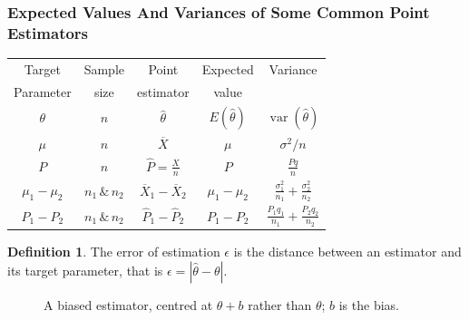 \documentclass[11pt,a4paper]{article}
\theoremstyle{definition}
\newtheorem{definition}[thm]{Definition}
\begin{document}
\subsubsection{Expected Values And Variances of Some Common Point Estimators}


\begin{table}[H]
\centering
\begin{tabular}{|c|c|c|c|c|}
\hline Target & Sample & Point & Expected & Variance\\
Parameter & size & estimator & value &\\
$\theta$ & $n$ & $\hat{\theta}$ & $E(\hat{\theta})$ & $\operatorname{var}(\hat{\theta})$\\
\hline $\mu$ & $n$ & $\overline{X}$ & $\mu$ & $\sigma^2/n$\\
$P$ & $n$ & $\hat{P}=\frac{X}{n}$ & $P$ & $\frac{Pq}{n}$\\
$\mu_1-\mu_2$ & $n_1\, \&\, n_2$ & $\overline{X}_1-\overline{X}_2$ & $\mu_1-\mu_2$& $\frac{\sigma^2_1}{n_1}+\frac{\sigma^2_2}{n_2}$\\
$P_1-P_2$ & $n_1\,\&\, n_2$ & $\hat{P}_1-\hat{P}_2$ & $P_1-P_2$ & $\frac{P_1q_1}{n_1}+\frac{P_2q_2}{n_2}$\\
\hline
\end{tabular}
\end{table}



\vspace{0.3cm}

\begin{definition}
The error of estimation $\epsilon$ is the distance between an estimator and its target parameter, that is $\epsilon =|\hat{\theta}-\theta|$.
\end{definition}





\begin{figure}[H]
\centering
{}
\caption{A biased estimator, centred at $\theta+b$ rather than $\theta$; $b$ is the bias.}
\end{figure}
\end{document}
